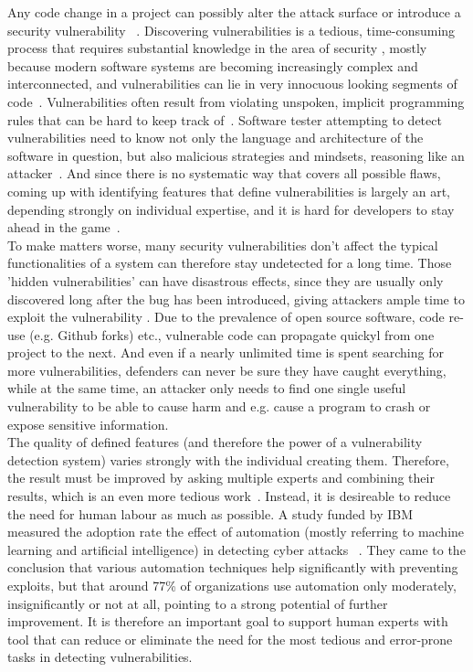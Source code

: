 \documentclass[
	a4paper,
	pagesize,
	pdftex,
	12pt,
	twoside, %
	BCOR=5mm, %
	ngerman,
	fleqn,
	final,
	]{scrartcl}
\begin{document}
Any code change in a project can possibly alter the attack surface or introduce a security vulnerability ~\cite{Morrison.2015}. Discovering vulnerabilities is a tedious, time-consuming process that requires substantial knowledge in the area of security \cite{Yamaguchi.2011}, mostly because modern software systems are becoming increasingly complex and interconnected, and vulnerabilities can lie in very innocuous looking segments of code~\cite{Pang.2015, Li.2018}. Vulnerabilities often result from violating unspoken, implicit programming rules that can be hard to keep track of~\cite{Li.2005}. Software tester attempting to detect vulnerabilities need to know not only the language and architecture of the software in question, but also malicious strategies and mindsets, reasoning like an attacker~\cite{Pang.2015}. And since there is no systematic way that covers all possible flaws, coming up with identifying features that define vulnerabilities is largely an art, depending strongly on individual expertise, and it is hard for developers to stay ahead in the game~\cite{Rolim.2018,Li.2018}.\\
To make matters worse, many security vulnerabilities don't affect the typical functionalities of a system can therefore stay undetected for a long time. Those 'hidden vulnerabilities' can have disastrous effects, since they are usually only discovered long after the bug has been introduced, giving attackers ample time to exploit the vulnerability \cite{Wijayasekara.2012,Ma.2017,Russell.2018}. Due to the prevalence of open source software, code re-use (e.g. Github forks) etc., vulnerable code can propagate quickyl from one project to the next. 
And even if a nearly unlimited time is spent searching for more vulnerabilities, defenders can never be sure they have caught everything, while at the same time, an attacker only needs to find one single useful vulnerability to be able to cause harm and e.g. cause a program to crash or expose sensitive information.\\

The quality of defined features (and therefore the power of a vulnerability detection system) varies strongly with the individual creating them. Therefore, the result must be improved by asking multiple experts and combining their results, which is an even more tedious work~\cite{Li.2018}. Instead, it is desireable to reduce the need for human labour as much as possible. A study funded by IBM measured the adoption rate the effect of automation (mostly referring to machine learning and artificial intelligence) in detecting cyber attacks ~\cite{IBMNewsRoom.}. They came to the conclusion that various automation techniques help significantly with preventing exploits, but that around 77\% of organizations use automation only moderately, insignificantly or not at all, pointing to a strong potential of further improvement. It is therefore an important goal to support human experts with tool that can reduce or eliminate the need for the most tedious and error-prone tasks in detecting vulnerabilities.
\end{document}
